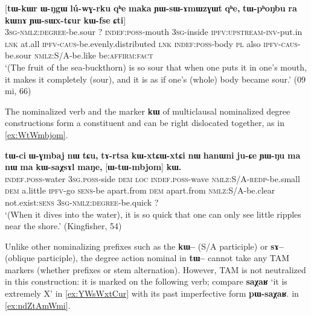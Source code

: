 \documentclass[oldfontcommands,oneside,a4paper,11pt]{article}
\newcommand{\ipa}[1]{{\phon\textbf{#1}}}
\begin{document}
\begin{exe}
\ex \label{ex:YWsWxtCur2}
\gll 
 	[\ipa{ɯ-tɯ-tɕur}]  	\ipa{\textbf{kɯ}}  	[\ipa{tɯ-kɯr}  	\ipa{ɯ-ŋgɯ}  	\ipa{lú-wɣ-rku}  	\ipa{qʰe}  	\ipa{maka}  	\ipa{ɲɯ-sɯ-ɤmɯzɣɯt}  	\ipa{qʰe,}  	\ipa{tɯ-pʰoŋbu}  	\ipa{ra}  	\ipa{kɯnɤ}  	\ipa{ɲɯ-sɯx-tɕur}  	\ipa{kɯ-fse}  	\ipa{ɕti}]  \\
  \textsc{3sg-nmlz:degree}-be.sour ?{ } \textsc{indef:poss}-mouth \textsc{3sg}-inside \textsc{ipfv:upstream-inv}-put.in \textsc{lnk} at.all \textsc{ipfv-caus}-be.evenly.distributed \textsc{lnk} \textsc{indef:poss}-body \textsc{pl} also \textsc{ipfv-caus}-be.sour \textsc{nmlz:S/A}-be.like be:\textsc{affirm}:\textsc{fact} \\
\glt `(The fruit of the sea-buckthorn) is so sour that when one puts it in one's mouth, it makes it completely (sour), and it is as if one's (whole) body became sour.' (09 mi, 66)
\end{exe}

The nominalized verb and the marker \ipa{kɯ} of multiclausal  nominalized degree constructions form a constituent and can be right dislocated together, as in \ref{ex:WtWmbjom}.

 \begin{exe}
\ex \label{ex:WtWmbjom}
\gll 
\ipa{tɯ-ci}  	\ipa{ɯ-ɣmbaj}  	\ipa{nɯ}  	\ipa{tɕu,}  	  	\ipa{tɤ-rtsa}  	\ipa{kɯ-xtɕɯ-xtɕi}  	\ipa{nɯ}  	\ipa{hanɯni}  	\ipa{ju-ɕe}  	\ipa{ɲɯ-ŋu}  	\ipa{ma}  	\ipa{nɯ}  	\ipa{ma}  	\ipa{kɯ-saχsɤl}  	\ipa{maŋe,}  	[\ipa{ɯ-tɯ-mbjom}]  	\ipa{\textbf{kɯ}.}  \\
\textsc{indef.poss}-water \textsc{3sg.poss}-side \textsc{dem} \textsc{loc} \textsc{indef.poss}-wave \textsc{nmlz:S/A-redp}-be.small \textsc{dem} a.little \textsc{ipfv}-go \textsc{sens}-be apart.from \textsc{dem} apart.from   \textsc{nmlz:S/A}-be.clear not.exist:\textsc{sens} \textsc{3sg-nmlz:degree}-be.quick ?{ } \\
\glt `(When it dives into the water), it is so quick that one can only see little ripples near the shore.'
 (Kingfisher, 54)
\end{exe}

Unlike other nominalizing prefixes such as the \ipa{kɯ--} (S/A participle) or \ipa{sɤ--} (oblique participle), the degree action nominal in \ipa{tɯ--} cannot take any TAM markers (whether prefixes or stem alternation). However, TAM is not neutralized in this construction: it is marked on the following verb; compare \ipa{saχaʁ} `it is extremely X' in \ref{ex:YWsWxtCur} with its past imperfective form \ipa{pɯ-saχaʁ}.
in \ref{ex:ndZtAmWmi}.
\end{document}
